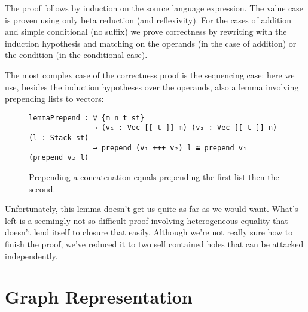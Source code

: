 \documentclass[a4paper]{article}
\begin{document}
        
        The proof follows by induction on the source language expression.
        The value case is proven using only beta reduction (and reflexivity).
        For the cases of addition and simple conditional (no suffix) we prove correctness
        by rewriting with the induction hypothesis and matching on the operands (in the case of addition) or the condition (in the conditional case).

        The most complex case of the correctness proof is the sequencing case:
        here we use, besides the induction hypotheses over the operands, also a lemma involving prepending lists to vectors:

        \begin{figure}[h!]
\begin{verbatim}
lemmaPrepend : ∀ {m n t st}
               → (v₁ : Vec [[ t ]] m) (v₂ : Vec [[ t ]] n) (l : Stack st)
               → prepend (v₁ +++ v₂) l ≅ prepend v₁ (prepend v₂ l)
\end{verbatim}
            \caption{Prepending a concatenation equals prepending the first list then the second.
                \label{lst:lemmaprepend}
            }
        \end{figure}

        Unfortunately, this lemma doesn't get us quite as far as we would want. What's left is a seemingly-not-so-difficult proof involving heterogeneous 
        equality that doesn't lend itself to closure that easily. Although we're not really sure how to finish the proof, we've reduced it to two
        self contained holes that can be attacked independently.
        

    \section{Graph Representation}
    \label{sec:lifting_introduction}


          
\end{document}
